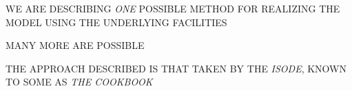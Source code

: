 

\begin{bwslide}

\begin{nrtc}
\item	WE ARE DESCRIBING \emph{ONE} POSSIBLE METHOD
	FOR REALIZING THE MODEL USING THE UNDERLYING FACILITIES

\item	MANY MORE ARE POSSIBLE

\item	THE APPROACH DESCRIBED IS THAT TAKEN BY THE \emph{ISODE},
	KNOWN TO SOME AS \emph{THE COOKBOOK}

\end{nrtc}
\end{bwslide}
